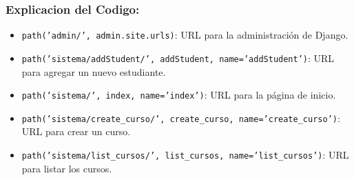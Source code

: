 \subsubsection*{Explicacion del Codigo:}

\begin{itemize}
\item \texttt{path('admin/', admin.site.urls)}: URL para la administración de Django.
\item \texttt{path('sistema/addStudent/', addStudent, name='addStudent')}: URL para agregar un nuevo estudiante.
\item \texttt{path('sistema/', index, name='index')}: URL para la página de inicio.
\item \texttt{path('sistema/create\_curso/', create\_curso, name='create\_curso')}: URL para crear un curso.
\item \texttt{path('sistema/list\_cursos/', list\_cursos, name='list\_cursos')}: URL para listar los cursos.
\end{itemize}